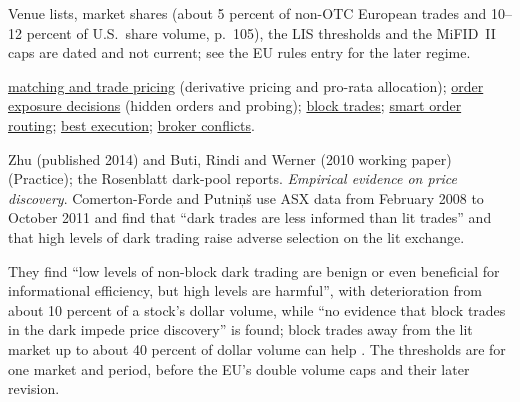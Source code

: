 \begin{qfdefinition}
Venue lists, market shares (about 5 percent of non-OTC European trades and 10--12 percent of U.S.\ share volume, p.~105), the LIS thresholds and the MiFID~II caps are dated and not current; see the EU rules entry for the later regime.

 \hyperref[mech:order-matching-pricing]{matching and trade pricing} (derivative pricing and pro-rata allocation); \hyperref[def:order-exposure-decisions]{order exposure decisions} (hidden orders and probing); \hyperref[def:block-trade]{block trades}; \hyperref[def:smart-order-routing]{smart order routing}; \hyperref[def:best-execution]{best execution}; \hyperref[def:broker-agency-conflicts]{broker conflicts}.

 Zhu (published 2014) and Buti, Rindi and Werner (2010 working paper) (Practice); the Rosenblatt dark-pool reports. \emph{Empirical evidence on price discovery}. Comerton-Forde and Putniņš use ASX data from February 2008 to October 2011 and find that ``dark trades are less informed than lit trades'' and that high levels of dark trading raise adverse selection on the lit exchange.

They find ``low levels of non-block dark trading are benign or even beneficial for informational efficiency, but high levels are harmful'', with deterioration from about 10 percent of a stock's dollar volume, while ``no evidence that block trades in the dark impede price discovery'' is found; block trades away from the lit market up to about 40 percent of dollar volume can help \citep[author's accepted manuscript of 13 February 2015, abstract and PDF pp.~4--5 and~10]{comerton-forde-putnins-2015}. The thresholds are for one market and period, before the EU's double volume caps and their later revision.

\end{qfdefinition}

